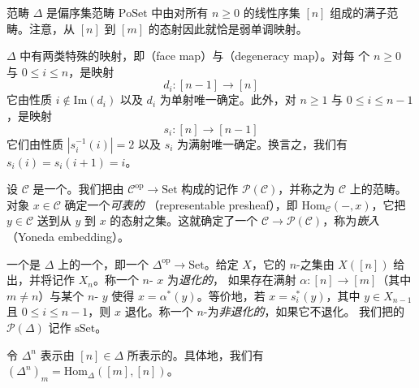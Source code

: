 \begin{definition}\label{def:delta}
范畴 $\Delta$ 是偏序集范畴 $\mathrm{PoSet}$ 中由对所有 $n \ge 0$ 的线性序集
$[n]$ 组成的满子范畴。注意，从 $[n]$ 到 $[m]$ 的态射因此就恰是弱单调映射。
\end{definition}

\begin{example*}
$\Delta$ 中有两类特殊的映射，即\trFaceMap{}（face map）与\trDegeneracyMap{}（degeneracy map）。对每
个 $n \ge 0$ 与 $0 \le i \le n$，\trFaceMap{}是映射
\[
d_i\colon [n-1] \to [n]
\]
它由性质 $i \notin \mathrm{Im}(d_i)$ 以及 $d_i$ 为单射唯一确定。此外，对 $n \ge 1$
与 $0 \le i \le n-1$，\trDegeneracyMap{}是映射
\[
s_i\colon [n] \to [n-1]
\]
它们由性质 $|s_i^{-1}(i)| = 2$ 以及 $s_i$ 为满射唯一确定。换言之，我们有
$s_i(i) = s_i(i+1) = i$。
\end{example*}

\begin{definition}\label{def:presheaf}
设 $\mathcal{C}$ 是一个\trCategory{}。我们把由\trFunctor{} $\mathcal{C}^{\mathrm{op}} \to \mathrm{Set}$ 构成的\trCategory{}记作 $\mathcal{P}(\mathcal{C})$，并称之为
$\mathcal{C}$ 上的\trPresheaf{}范畴。对象 $x \in \mathcal{C}$ 确定一个\emph{可表的}\trPresheaf{}%
（representable presheaf），即\trPresheaf{} $\mathrm{Hom}_{\mathcal{C}}(-,x)$，它把
$y \in \mathcal{C}$ 送到从 $y$ 到 $x$ 的态射之集。这就确定了一个\trFunctor{}%
$\mathcal{C} \to \mathcal{P}(\mathcal{C})$，称为\emph{\trYoneda{}嵌入}（Yoneda
embedding）。
\end{definition}

\begin{definition}\label{def:simplicial-set}
一个\trSimplicialSet{}是 $\Delta$ 上的一个\trPresheaf{}，即一个\trFunctor{}%
$\Delta^{\mathrm{op}} \to \mathrm{Set}$。给定\trSimplicialSet{} $X$，它的
$n$-\trSimplex{}之集由 $X([n])$ 给出，并将记作 $X_n$。称一个 $n$-\trSimplex{} $x$ 为\emph{退化的}，
如果存在满射 $\alpha\colon [n] \to [m]$（其中 $m \neq n$）与某个 $n$-\trSimplex{} $y$ 使得
$x = \alpha^*(y)$。等价地，若 $x = s_i^*(y)$，其中 $y \in X_{n-1}$ 且
$0 \le i \le n-1$，则 $x$ 退化。称一个 $n$-\trSimplex{}为\emph{非退化的}，如果它不退化。
我们把\trSimplicialSet{}的\trCategory{} $\mathcal{P}(\Delta)$ 记作
$\mathrm{sSet}$。
\end{definition}

\begin{definition}\label{def:standard-simplex}
令 $\Delta^n$ 表示由 $[n] \in \Delta$ 所表示的\trSimplicialSet{}。具体地，我们有
$(\Delta^n)_m = \mathrm{Hom}_{\Delta}([m],[n])$。
\end{definition}

